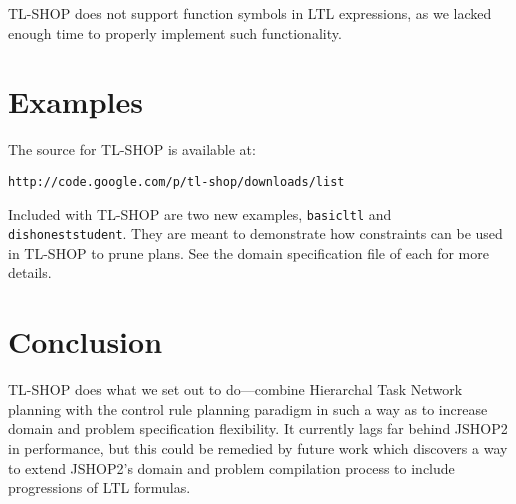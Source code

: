 \documentclass[12pt]{article}
\begin{document}
TL-SHOP does not support function symbols in LTL expressions, as we lacked 
enough time to properly implement such functionality.

\section{Examples}
The source for TL-SHOP is available at:
\begin{verbatim}
http://code.google.com/p/tl-shop/downloads/list
\end{verbatim}
Included with TL-SHOP 
are two new examples, \texttt{basicltl} and \texttt{dishoneststudent}. They are 
meant to demonstrate how constraints can be used in TL-SHOP to prune plans. See 
the domain specification file of each for more details.

\section{Conclusion}
TL-SHOP does what we set out to do---combine Hierarchal Task Network planning 
with the control rule planning paradigm in such a way as to increase domain and 
problem specification flexibility. It currently lags far behind JSHOP2 in 
performance, but this could be remedied by future work which discovers a way to 
extend JSHOP2's domain and problem compilation process to include progressions 
of LTL formulas.



\end{document}
